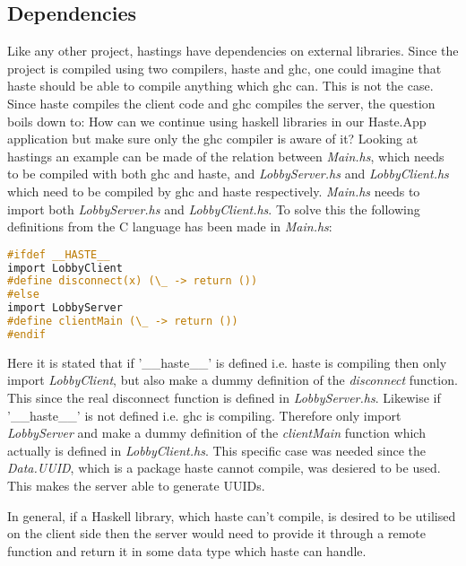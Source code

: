 \documentclass[a4paper]{article}
\begin{document}
\subsection{Dependencies}
\label{sub:dependencies}
Like any other project, hastings have dependencies on external libraries. Since the project is compiled using two compilers, haste and ghc, one could imagine that haste should be able to compile anything which ghc can. This is not the case. Since haste compiles the client code and ghc compiles the server, the question boils down to: How can we continue using haskell libraries in our Haste.App application but make sure only the ghc compiler is aware of it? Looking at hastings an example can be made of the relation between \textit{Main.hs}, which needs to be compiled with both ghc and haste, and \textit{LobbyServer.hs} and \textit{LobbyClient.hs} which need to be compiled by ghc and haste respectively.
\textit{Main.hs} needs to import both \textit{LobbyServer.hs} and \textit{LobbyClient.hs}. To solve this the following definitions from the C language has been made in \textit{Main.hs}:
\begin{lstlisting}[language=C]
#ifdef __HASTE__
import LobbyClient
#define disconnect(x) (\_ -> return ())
#else
import LobbyServer
#define clientMain (\_ -> return ())
#endif
\end{lstlisting}
Here it is stated that if '\_\_haste\_\_' is defined i.e. haste is compiling then only import \textit{LobbyClient}, but also make a dummy definition of the \textit{disconnect} function. This since the real disconnect function is defined in \textit{LobbyServer.hs}. Likewise if '\_\_haste\_\_' is not defined i.e. ghc is compiling. Therefore only import \textit{LobbyServer} and make a dummy definition of the \textit{clientMain} function which actually is defined in \textit{LobbyClient.hs}. This specific case was needed since the \textit{Data.UUID}, which is a package haste cannot compile, was desiered to be used. This makes the server able to generate UUIDs.

In general, if a Haskell library, which haste can't compile, is desired to be utilised on the client side then the server would need to provide it through a remote function and return it in some data type which haste can handle.
\end{document}
